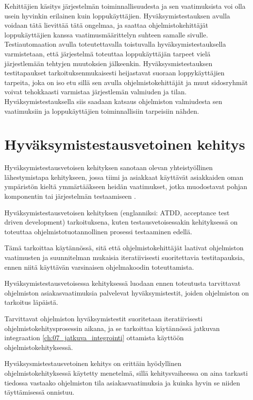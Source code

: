   Kehittäjien käsitys järjestelmän toiminnallisuudesta ja sen vaatimuksista voi olla usein hyvinkin erilainen kuin loppukäyttäjien.
  Hyväksymistestauksen avulla voidaan tätä lievittää tätä ongelmaa, ja saattaa ohjelmistokehittäjät loppukäyttäjien kanssa vaatimusmäärittelyn suhteen samalle sivulle.
  Testiautomaation avulla toteutettavalla toistuvalla hyväksymistestauksella varmistetaan, että järjestelmä toteuttaa loppukäyttäjän tarpeet vielä järjestlemään tehtyjen muutoksien jälkeenkin.
  Hyväksysmistestauksen testitapaukset tarkoituksenmukaisesti heijastavat suoraan loppykäyttäjien tarpeita, joka on iso etu sillä sen avulla ohjelmistokehittäjät ja muut sidosryhmät voivat tehokkaasti varmistaa järjestlemän valmiuden ja tilan.
  Hyväksymistestauksella siis saadaan katsaus ohjelmiston valmiudesta sen vaatimuksiin ja loppukäyttäjien toiminnallisiin tarpeisiin nähden.

\section{Hyväksymistestausvetoinen kehitys} \label{ch:08_hyvaksymistestausvetoinen_kehitys}

  Hyväksymistestausvetoisen kehityksen sanotaan olevan yhteistyöllinen lähestymistapa kehitykseen, jossa tiimi ja asiakkaat käyttävät asiakkaiden oman ympäristön kieltä ymmärtääkseen heidän vaatimukset, jotka muodostavat pohjan komponentin tai järjestelmän testaamiseen \parencite{istqb_glossary_nodate}.

  Hyväksymistestausvetoisen kehityksen (englanniksi: ATDD, acceptance test driven development) tarkoituksena, kuten testausvetoisessakin kehityksessä on toteuttaa ohjelmistotuotannollinen prosessi testaaminen edellä.

  Tämä tarkoittaa käytännössä, sitä että ohjelmistokehittäjät laativat ohjelmiston vaatimusten ja suunnitelman mukaisia iteratiivisesti suoritettavia testitapauksia, ennen niitä käyttävän varsinaisen ohjelmakoodin toteuttamista.

  Hyväksymistestausvetoisessa kehityksessä luodaan ennen toteutusta tarvittavat ohjelmiston asiakasvaatimuksia palvelevat hyväksymistestit, joiden ohjelmiston on tarkoitus läpäistä.

  Tarvittavat ohjelmiston hyväksymistestit suoritetaan iteratiivisesti ohjelmistokehitysprosessin aikana, ja se tarkoittaa käytännössä jatkuvan integraation \ref{ch:07_jatkuva_integrointi} ottamista käyttöön ohjelmistokehityksessä.

  Hyväksysmistestausvetoinen kehitys on erittäin hyödyllinen ohjelmistokehityksessä käytetty menetelmä, sillä kehitysvaiheessa on aina tarkasti tiedossa vastaako ohjelmiston tila asiakasvaatimuksia ja kuinka hyvin se niiden täyttämisessä onnistuu.


